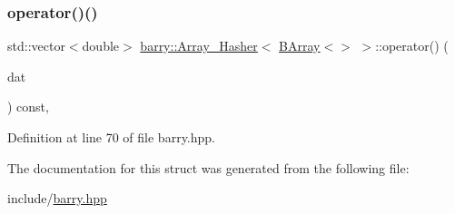\subsubsection{\texorpdfstring{operator()()}{operator()()}}
{\footnotesize\ttfamily std\+::vector$<$double$>$ \hyperlink{structbarry_1_1_array___hasher}{barry\+::\+Array\+\_\+\+Hasher}$<$ \hyperlink{classbarry_1_1_b_array}{B\+Array}$<$$>$ $>$\+::operator() (\begin{DoxyParamCaption}\item[{\hyperlink{classbarry_1_1_b_array}{B\+Array}$<$$>$ const \&}]{dat }\end{DoxyParamCaption}) const\hspace{0.3cm}{\ttfamily [inline]}, {\ttfamily [noexcept]}}



Definition at line 70 of file barry.\+hpp.



The documentation for this struct was generated from the following file\+:\begin{DoxyCompactItemize}
\item 
include/\hyperlink{barry_8hpp}{barry.\+hpp}\end{DoxyCompactItemize}
